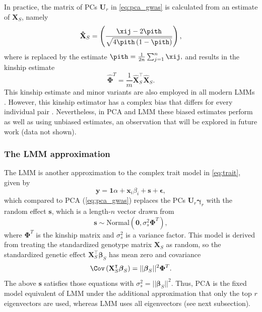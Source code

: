 \documentclass[11pt]{article}
\begin{document}
In practice, the matrix of PCs $\mathbf{U}_r$ in \cref{eq:pca_gwas} is calculated from an estimate of $\mathbf{X}_S$, namely
\begin{equation*}
  \mathbf{\hat{X}}_S
  =
  \left(
    \frac{
      \xij - 2 \pith
    }{
      \sqrt{4 \pith \left( 1 - \pith \right)}
    }
  \right)
  ,
\end{equation*}
where \pit is replaced by the estimate
$
\pith = \frac{1}{2n} \sum_{j = 1}^n \xij,
$
and results in the kinship estimate
\begin{equation}
  \label{eq:kinship_std}
  \mathbf{\hat{\Phi}}^T
  =
  \frac{1}{m}
  \mathbf{\hat{X}}_S^\intercal
  \mathbf{\hat{X}}_S
  .
\end{equation}
This kinship estimate and minor variants are also employed in all modern LMMs \citep{yang_gcta:_2011}.
However, this kinship estimator has a complex bias that differs for every individual pair \citep{ochoa_estimating_2021, ochoa_human}.
Nevertheless, in PCA and LMM these biased estimates perform as well as using unbiased estimates, an observation that will be explored in future work (data not shown).

\subsubsection{The LMM approximation}

The LMM is another approximation to the complex trait model in \cref{eq:trait}, given by
\begin{equation}
  \label{eq:lmm_gwas}
  \mathbf{y}
  =
  \mathbf{1} \alpha + \mathbf{x}_i \beta_i + \mathbf{s} + \boldsymbol{\epsilon}
  ,
\end{equation}
which compared to PCA (\cref{eq:pca_gwas}) replaces the PCs $\mathbf{U}_r \boldsymbol{\gamma}_r$ with the random effect $\mathbf{s}$, which is a length-$n$ vector drawn from \citep{sul_population_2018}
$$
\mathbf{s} \sim \text{Normal} \left( \mathbf{0}, \sigma^2_s \mathbf{\Phi}^T \right),
$$
where $\mathbf{\Phi}^T$ is the kinship matrix and $\sigma^2_s$ is a variance factor.
This model is derived from treating the standardized genotype matrix $\mathbf{X}_S$ as random, so the standardized genetic effect
$\mathbf{X}_S^\intercal \boldsymbol{\beta}_S$
has mean zero and covariance
$$
\Cov \left( \mathbf{X}_S^\intercal \boldsymbol{\beta}_S \right)
=
|| \boldsymbol{\beta}_S ||^2 \mathbf{\Phi}^T
.
$$
The above $\mathbf{s}$ satisfies those equations with $\sigma^2_s = || \boldsymbol{\beta}_S ||^2$.
Thus, PCA is the fixed model equivalent of LMM under the additional approximation that only the top $r$ eigenvectors are used, whereas LMM uses all eigenvectors (see next subsection).
\end{document}
